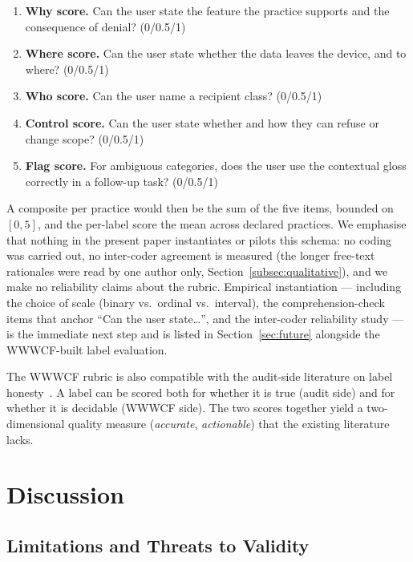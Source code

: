 \documentclass[11pt,a4paper]{article}
\makeatletter
\let\@oldsection\section
\renewcommand{\section}{\FloatBarrier\@oldsection}
\makeatother
\begin{document}
\begin{enumerate}
    \item \textbf{Why score.} Can the user state the feature the
    practice supports and the consequence of denial? (0/0.5/1)
    \item \textbf{Where score.} Can the user state whether the data
    leaves the device, and to where? (0/0.5/1)
    \item \textbf{Who score.} Can the user name a recipient class?
    (0/0.5/1)
    \item \textbf{Control score.} Can the user state whether and how
    they can refuse or change scope? (0/0.5/1)
    \item \textbf{Flag score.} For ambiguous categories, does the user
    use the contextual gloss correctly in a follow-up task?
    (0/0.5/1)
\end{enumerate}

A composite per practice would then be the sum of the five items,
bounded on $[0,5]$, and the per-label score the mean across declared
practices. We emphasise that nothing in the present paper instantiates
or pilots this schema: no coding was carried out, no inter-coder
agreement is measured (the longer free-text rationales were read by
one author only, Section~\ref{subsec:qualitative}), and we make no
reliability claims about the rubric. Empirical instantiation ---
including the choice of scale (binary vs.\ ordinal vs.\ interval),
the comprehension-check items that anchor ``Can the user state\dots'',
and the inter-coder reliability study --- is the immediate next step
and is listed in Section~\ref{sec:future} alongside the WWWCF-built
label evaluation.

The WWWCF rubric is also compatible with the audit-side literature on
label honesty~\citep{kollnig:etal:2022,koch:etal:2022,andow:etal:2020}.
A label can be scored both for whether it is true (audit side) and for
whether it is decidable (WWWCF side). The two scores together yield a
two-dimensional quality measure (\emph{accurate}, \emph{actionable})
that the existing literature lacks.

\section{Discussion}
\label{sec:limitations}

\subsection{Limitations and Threats to Validity}
\end{document}
